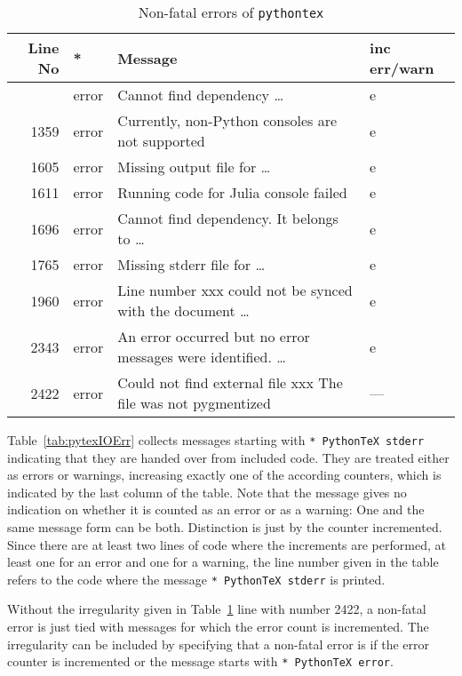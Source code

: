 \documentclass{article}
\begin{document}
{\small
\begin{longtable}{|rlll|}
  \toprule
  Line No       & * & Message & inc err/warn  \\
  \midrule
  \midrule
  \endfirsthead%
  \bottomrule
  \caption{\label{tab:pytexNFErr} Non-fatal errors of \texttt{pythontex}  }
  \endlastfoot%
   655 & error  & Cannot find dependency \dots                                   & e   \\%
  1359 & error  & Currently, non-Python consoles are not supported               & e   \\%
  1605 & error  & Missing output file for \dots                                  & e   \\%
  1611 & error  & Running code for Julia console failed                          & e   \\%
  1696 & error  & Cannot find dependency. It belongs to \dots                    & e   \\%
  1765 & error  & Missing stderr file for \dots                                  & e   \\%
  1960 & error  & Line number xxx could not be synced with the document \dots    & e   \\%
  2343 & error  & An error occurred but no error messages were identified. \dots & e   \\
  2422 & error  & Could not find external file xxx The file was not pygmentized  & --- \\ %
\end{longtable}
} %

Table~\ref{tab:pytexIOErr} collects messages starting with \texttt{* PythonTeX stderr} 
indicating that they are handed over from included code.  
They are treated either as errors or warnings, 
increasing exactly one of the according counters, 
which is indicated by the last column of the table. 
Note that the message gives no indication on whether it is counted as an error or as a warning: 
One and the same message form can be both. 
Distinction is just by the counter incremented. 
Since there are at least two lines of code where the increments are performed, 
at least one for an error and one for a warning, 
the line number given in the table refers to the code where the message 
\texttt{* PythonTeX stderr} is printed. 

Without the irregularity given in Table~\ref{tab:pytexNFErr} line with number 2422, 
a non-fatal error is just tied with messages for which the error count is incremented. 
The irregularity can be included by specifying 
that a non-fatal error is if the error counter is incremented 
or the message starts with \texttt{* PythonTeX error}. 
\end{document}
